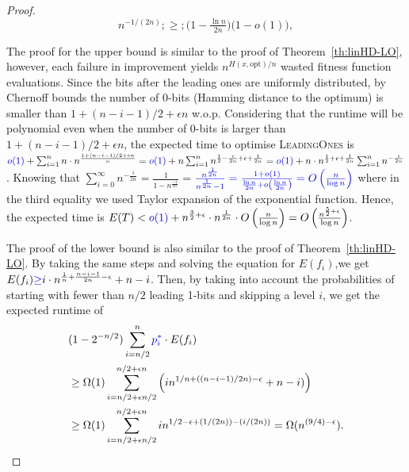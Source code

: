 \documentclass[lettersize,journal]{IEEEtran}
\begin{document}
\begin{proof}
	
	$$ n^{-1/(2n)} ;\ge; \bigl(1-\tfrac{\ln n}{2n}\bigr)\bigl(1-o(1)\bigr), $$ 
	
The proof for the upper bound is similar to the proof of Theorem~\ref{th:linHD-LO}, however, each 
failure in improvement yields $n^{H(x, \text{opt})/n}$ wasted fitness function evaluations. 
Since the bits after the leading ones are uniformly distributed, by Chernoff bounds the number 
of 0-bits (Hamming distance to the optimum) is smaller than  $1+(n-i-1)/2+\epsilon n$ 
w.o.p. {\color{blue}Considering that the runtime will be polynomial even when the number of $0$-bits is larger than $1+(n-i-1)/2+\epsilon n$}, the expected time to optimise \textsc{LeadingOnes} is ${\color{blue}o(1)}+\sum_{i=1}^{n} n \cdot 
n^{\frac{1+(n-i-1)/2+\epsilon n}{n}}= {\color{blue}o(1)}+n \sum_{i=1}^{n} 
n^{\frac{1}{2}-\frac{i}{2n}+\epsilon+\frac{1}{2n}}={\color{blue}o(1)}+n \cdot n^{\frac{1}{2}+\epsilon+\frac{1}{2n}} \sum_{i=1}^{n} 
n^{-\frac{i}{2n}}$. Knowing that 
$\sum_{i=0}^{\infty}n^{-\frac{i}{2n}}=\frac{1}{1-n^{\frac{-1}{2n}}}=${$\color{blue} \frac{n^{\frac{1}{2n}}}{n^{\frac{1}{2n}} - 1} = \frac{1 + o(1)}{\frac{\ln{n}}{2n} + o\left(\frac{\ln{n}}{2n}\right)} = O\left(\frac{n}{\log{n}}\right)$ where in the third equality we used Taylor expansion of the exponential function.}  Hence, the expected time is $E(T) 
< {\color{blue}o(1)}+n^{\frac{3}{2}+\epsilon} \cdot n^{\frac{1}{2n}} \cdot O\left(\frac{n}{\log n}\right)=O\left(\frac{n^{\frac{5}{2}+\epsilon}}{\log n}\right)$.



The proof of the lower bound is also similar to the proof of Theorem~\ref{th:linHD-LO}. 
By taking the same steps and solving the equation for $E(f_i)$,we get
$E(f_i){\color{blue}\ge} i \cdot n^{\frac{1}{n}+\frac{n-i-1}{2n}-\epsilon}+n-i$. Then, by taking into account the probabilities of starting with fewer than $n/2$ leading 1-bits and skipping a level $i$, we get the expected runtime of 
\begin{align*}
&(1-2^{-n/2})\sum_{i=n/2}^{n} {\color{blue}p_{i}^{*}} \cdot E(f_i)\\
&\geq \Omega(1) \sum_{i=n/2+\epsilon 
	n/2}^{n/2+\epsilon n} 
\left( i n^{1/n+((n-i-1)/2n)-\epsilon}+n-i )\right)\\
&\geq \Omega(1) \sum_{i=n/2+\epsilon 
	n/2}^{n/2+\epsilon n}  in^{1/2-\epsilon+(1/(2n))-(i/(2n))}= \Omega(n^{(9/4)-\epsilon}).
	\end{align*} 
\end{proof}
\end{document}
